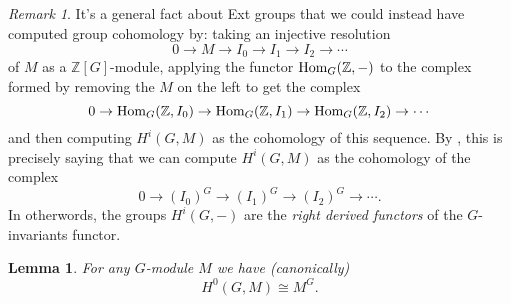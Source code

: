 \documentclass[11pt]{amsart}
\numberwithin{equation}{section}
\newtheorem{lemma}[equation]{Lemma}
\theoremstyle{remark}
\newtheorem{remark}[equation]{Remark}
\theoremstyle{remark}
\theoremstyle{remark}
\theoremstyle{definition}
\theoremstyle{definition}
\theoremstyle{definition}
\theoremstyle{definition}
\theoremstyle{definition}
\theoremstyle{definition}
\begin{document}
\begin{remark}
It's a general fact about Ext groups that we could instead have computed group cohomology by: taking an injective resolution
\[0\rightarrow M\stackrel{}{\rightarrow} I_0 \stackrel{}{\rightarrow} I_1 \stackrel{}{\rightarrow}I_2 \stackrel{}{\rightarrow} \cdots \]
of $M$ as a $\mathbb{Z}[G]$-module,
applying the functor $\textup{Hom}_{G}(\mathbb{Z},-)$ to the complex formed by removing the $M$ on the left to get the complex
\[0\rightarrow \textup{Hom}_G(\mathbb{Z},I_0)\rightarrow \textup{Hom}_G(\mathbb{Z},I_1)\rightarrow \textup{Hom}_G(\mathbb{Z},I_2)\rightarrow \cdots\]
and then computing $H^i(G,M)$ as the cohomology of this sequence. By , this is precisely saying that we can compute $H^i(G,M)$ as the cohomology of the complex
\[0\stackrel{}{\rightarrow} (I_0)^G \stackrel{}{\rightarrow} (I_1)^G \stackrel{}{\rightarrow}(I_2)^G \stackrel{}{\rightarrow} \cdots.\]
In otherwords, the groups $H^i(G,-)$ are the \textit{right derived functors} of the $G$-invariants functor. 
\end{remark}

\begin{lemma} \label{0cohomology is invariants}
For any $G$-module $M$ we have (canonically)
\[H^0(G,M)\cong M^G.\]
\end{lemma}
\end{document}
